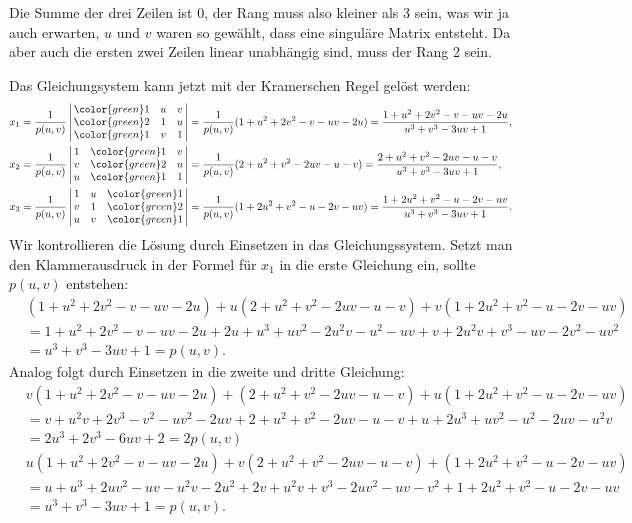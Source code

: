 \begin{loesung}
\begin{teilaufgaben}
Die Summe der drei Zeilen ist 0, der Rang muss also kleiner als 3 sein,
was wir ja auch erwarten, $u$ und $v$ waren so gewählt, dass eine singuläre
Matrix entsteht.
Da aber auch die ersten zwei Zeilen linear unabhängig sind, muss der
Rang 2 sein.
\item
Das Gleichungsystem kann jetzt mit der Kramerschen Regel gelöst werden:
\begin{align*}
x_1&=\frac1{p(u,v)}\left|\,\begin{matrix}
\color{green}1&u&v\\
\color{green}2&1&u\\
\color{green}1&v&1
\end{matrix}\,\right|
=\frac1{p(u,v)}
(1+u^2+2v^2-v-uv-2u)
=\frac{1+u^2+2v^2-v-uv-2u}{u^3+v^3-3uv+1},
\\
x_2&=\frac1{p(u,v)}\left|\,\begin{matrix}
1&\color{green}1&v\\
v&\color{green}2&u\\
u&\color{green}1&1
\end{matrix}\,\right|
=\frac1{p(u,v)}
(2+u^2+v^2-2uv-u-v)
=\frac{2+u^2+v^2-2uv-u-v}{u^3+v^3-3uv+1},
\\
x_3&=\frac1{p(u,v)}\left|\,\begin{matrix}
1&u&\color{green}1\\
v&1&\color{green}2\\
u&v&\color{green}1
\end{matrix}\,\right|
=\frac1{p(u,v)}
(1+2u^2+v^2-u-2v-uv)
=\frac{1+2u^2+v^2-u-2v-uv}{u^3+v^3-3uv+1}.
\end{align*}
Wir kontrollieren die Lösung durch Einsetzen in das Gleichungssystem.
Setzt man den Klammerausdruck in der Formel für $x_1$ in die erste Gleichung
ein, sollte $p(u,v)$ entstehen:
\begin{align*}
&(1+u^2+2v^2-v-uv-2u)
+
u(2+u^2+v^2-2uv-u-v)
+
v(1+2u^2+v^2-u-2v-uv)
\\
&=
1+u^2+2v^2-v-uv-2u
+
2u+u^3+uv^2-2u^2v-u^2-uv
+
v+2u^2v+v^3-uv-2v^2-uv^2
\\
&=u^3+v^3-3uv+1=p(u,v).
\end{align*}
Analog folgt durch Einsetzen in die zweite und dritte Gleichung:
\begin{align*}
&
v(1+u^2+2v^2-v-uv-2u)
+
(2+u^2+v^2-2uv-u-v)
+
u(1+2u^2+v^2-u-2v-uv)
\\
&=
v+u^2v+2v^3-v^2-uv^2-2uv
+
2+u^2+v^2-2uv-u-v
+
u+2u^3+uv^2-u^2-2uv-u^2v
\\
&=
2u^3+2v^3-6uv+2=2p(u,v)
\\
&
u(1+u^2+2v^2-v-uv-2u)
+
v(2+u^2+v^2-2uv-u-v)
+
(1+2u^2+v^2-u-2v-uv)
\\
&=
u+u^3+2uv^2-uv-u^2v-2u^2
+
2v+u^2v+v^3-2uv^2-uv-v^2
+
1+2u^2+v^2-u-2v-uv
\\
&=
u^3+v^3-3uv+1=p(u,v).
\end{align*}

\end{teilaufgaben}
\end{loesung}

